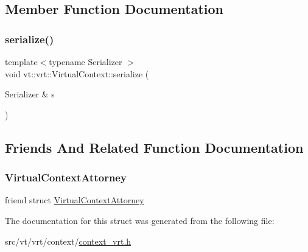 \subsection{Member Function Documentation}
\mbox{\label{structvt_1_1vrt_1_1_virtual_context_a2fc163ea1aac29506aabab3fdcdac610}} 
\subsubsection{\texorpdfstring{serialize()}{serialize()}}
{\footnotesize\ttfamily template$<$typename Serializer $>$ \\
void vt\+::vrt\+::\+Virtual\+Context\+::serialize (\begin{DoxyParamCaption}\item[{Serializer \&}]{s }\end{DoxyParamCaption})\hspace{0.3cm}{\ttfamily [inline]}}



\subsection{Friends And Related Function Documentation}
\mbox{\label{structvt_1_1vrt_1_1_virtual_context_a3c098ac4f050b85316f4ae9eef22a43e}} 
\subsubsection{\texorpdfstring{Virtual\+Context\+Attorney}{VirtualContextAttorney}}
{\footnotesize\ttfamily friend struct \hyperlink{structvt_1_1vrt_1_1_virtual_context_attorney}{Virtual\+Context\+Attorney}\hspace{0.3cm}{\ttfamily [friend]}}



The documentation for this struct was generated from the following file\+:\begin{DoxyCompactItemize}
\item 
src/vt/vrt/context/\hyperlink{context__vrt_8h}{context\+\_\+vrt.\+h}\end{DoxyCompactItemize}
